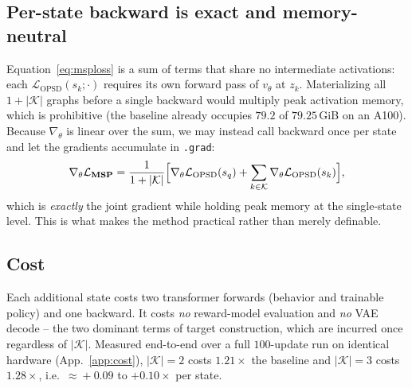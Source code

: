 \subsection{Per-state backward is exact and memory-neutral}

Equation~\eqref{eq:msploss} is a sum of terms that share no intermediate activations:
each $\mathcal L_{\mathrm{OPSD}}(s_k;\cdot)$ requires its own forward pass of $v_\theta$
at $z_k$. Materializing all $1+|\mathcal K|$ graphs before a single backward would multiply
peak activation memory, which is prohibitive (the baseline already occupies
$79.2$ of $79.25$\,GiB on an A100). Because $\nabla_\theta$ is linear over the sum, we may
instead call backward once per state and let the gradients accumulate in
\texttt{.grad}:
\begin{equation}
\nabla_\theta\mathcal L_{\textbf{MSP}}
=\frac{1}{1+|\mathcal K|}\Big[\nabla_\theta\mathcal L_{\mathrm{OPSD}}(s_q)
+\sum_{k\in\mathcal K}\nabla_\theta\mathcal L_{\mathrm{OPSD}}(s_k)\Big],
\end{equation}
which is \emph{exactly} the joint gradient while holding peak memory at the single-state
level. This is what makes the method practical rather than merely definable.

\subsection{Cost}

Each additional state costs two transformer forwards (behavior and trainable policy) and
one backward. It costs \emph{no} reward-model evaluation and \emph{no} VAE decode -- the
two dominant terms of target construction, which are incurred once regardless of
$|\mathcal K|$. Measured end-to-end over a full $100$-update run on identical hardware
(App.~\ref{app:cost}), $|\mathcal K|=2$ costs $1.21\times$ the baseline and
$|\mathcal K|=3$ costs $1.28\times$, i.e.\ $\approx\!+0.09$ to $+0.10\times$ per state.

